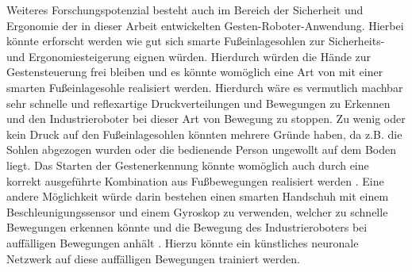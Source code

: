 Weiteres Forschungspotenzial besteht auch im Bereich der Sicherheit und Ergonomie der in dieser Arbeit entwickelten Gesten-Roboter-Anwendung. Hierbei könnte erforscht werden wie gut sich smarte Fußeinlagesohlen zur Sicherheits- und Ergonomiesteigerung eignen würden. Hierdurch würden die Hände zur Gestensteuerung frei bleiben und es könnte womöglich eine Art von  mit einer smarten Fußeinlagesohle realisiert werden. Hierdurch wäre es vermutlich machbar sehr schnelle und reflexartige Druckverteilungen und Bewegungen zu Erkennen und den Industrieroboter bei dieser Art von Bewegung zu stoppen. Zu wenig oder kein Druck auf den Fußeinlagesohlen könnten mehrere Gründe haben, da z.B. die Sohlen abgezogen wurden oder die bedienende Person ungewollt auf dem Boden liegt. Das Starten der Gestenerkennung könnte womöglich auch durch eine korrekt ausgeführte Kombination aus Fußbewegungen realisiert werden \cite{tan_design_2015}. Eine andere Möglichkeit würde darin bestehen einen smarten Handschuh mit einem Beschleunigungssensor und einem Gyroskop zu verwenden, welcher zu schnelle Bewegungen erkennen könnte und die Bewegung des Industrieroboters bei auffälligen Bewegungen anhält \cite{ghimire_smart_2019}. Hierzu könnte ein künstliches neuronale Netzwerk auf diese auffälligen Bewegungen trainiert werden.

